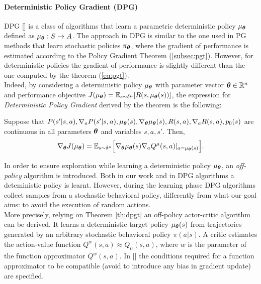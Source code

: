 \paragraph{Deterministic Policy Gradient (DPG)} \label{subsec:dpg}
\ac{DPG} [\cite{article}] is a class of algorithms that learn a parametric deterministic policy $\mu_{\boldsymbol{\theta}}$ defined as $\mu_{\boldsymbol{\theta}}: S \to A$. The approach in \ac{DPG} is similar to the one used in \ac{PG} methods that learn stochastic policies $\pi_{\boldsymbol{\theta}}$, where the gradient of performance is estimated according to the Policy Gradient Theorem (\ref{subsec:pgt}). However, for deterministic policies the gradient of performance is slightly different than the one computed by the theorem (\ref{eq:pgt}).\\
\newline
Indeed, by considering a deterministic policy $\mu_{\boldsymbol{\theta}}$ with parameter vector $\boldsymbol{\theta} \in \mathbb{R}^n$ and performance objective $J(\mu_{\boldsymbol{\theta}}) = \mathbb{E}_{s \sim \delta^{\mu}}[R(s, \mu_{\boldsymbol{\theta}}(s))]$, the expression for \emph{Deterministic Policy Gradient} derived by the theorem is the following:
\begin{theorem} \label{th:dpgt}
	Suppose that $P(s'|s,a), \nabla_aP(s'|s,a), \mu_{\boldsymbol{\theta}}(s), \nabla_{\boldsymbol{\theta}} \mu_{\boldsymbol{\theta}}(s), R(s,a), \nabla_a R(s,a), p_0(s)$ are continuous in all parameters $\boldsymbol{\theta}$ and variables $s, a, s'$. Then, 
	\begin{align}
	\nabla_{\boldsymbol{\theta}}J(\mu_{\boldsymbol{\theta}}) = \mathbb{E}_{s \sim \delta^{\mu}} \Big[\nabla_{\boldsymbol{\theta}} \mu_{\boldsymbol{\theta}} (s) \nabla_a Q^{\mu}(s,a)|_{a = \mu_{\boldsymbol{\theta}} (s)}\Big].
	\end{align}
\end{theorem}
\noindent In order to ensure exploration while learning a deterministic policy $\mu_{\boldsymbol{\theta}}$, an \emph{off-policy} algorithm is introduced. %
Both in our work and in \ac{DPG} algorithms a deteministic policy is learnt. However, during the learning phase \ac{DPG} algorithms collect samples from a stochastic behavioral policy, differently from what our goal aims: to avoid the execution of random actions.\\
\newline
More precisely, relying on Theorem \ref{th:dpgt} an off-policy actor-critic algorithm can be derived. It learns a deterministic target policy $\mu_{\boldsymbol{\theta}}(s)$ from trajectories generated by an arbitrary stochastic behavioral policy $\pi(a|s)$. A critic estimates the action-value function $Q^w(s,a) \approx Q_{\mu}(s,a)$, where $w$ is the parameter of the function approximator $Q^w(s,a)$. In [\cite{article}] the conditions required for a function approximator to be compatible (\ie avoid to introduce any bias in gradient update) are specified.\\
